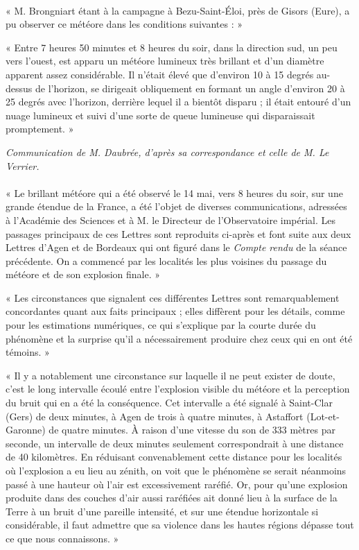 \documentclass[a4paper, 11pt, oneside, polutonikogreek, french]{article}
\begin{document}
\paragraph{}
« M. Brongniart étant à la campagne à Bezu-Saint-Éloi, près de Gisors (Eure), a pu observer ce météore dans les conditions suivantes : »

« Entre 7 heures 50 minutes et 8 heures du soir, dans la direction sud, un peu vers l'ouest, est apparu un météore lumineux très brillant et d'un diamètre apparent assez considérable. Il n'était élevé que d'environ 10 à 15 degrés au-dessus de l'horizon, se dirigeait obliquement en formant un angle d'environ 20 à 25 degrés avec l'horizon, derrière lequel il a bientôt disparu ; il était entouré d'un nuage lumineux et suivi d'une sorte de queue lumineuse qui disparaissait promptement. »
\begin{center}
\emph{Communication de M. Daubrée, d'après sa correspondance et celle de M. Le Verrier.}
\end{center}
\paragraph{}
« Le brillant météore qui a été observé le 14 mai, vers 8 heures du soir, sur une grande étendue de la France, a été l'objet de diverses communications, adressées à l'Académie des Sciences et à M. le Directeur de l'Observatoire impérial. Les passages principaux de ces Lettres sont reproduits ci-après et font suite aux deux Lettres d'Agen et de Bordeaux qui ont figuré dans le \emph{Compte rendu} de la séance précédente. On a commencé par les localités les plus voisines du passage du météore et de son explosion finale. »

« Les circonstances que signalent ces différentes Lettres sont remarquablement concordantes quant aux faits principaux ; elles diffèrent pour les détails, comme pour les estimations numériques, ce qui s'explique par la courte durée du phénomène et la surprise qu'il a nécessairement produire chez ceux qui en ont été témoins. »

« Il y a notablement une circonstance sur laquelle il ne peut exister de doute, c'est le long intervalle écoulé entre l'explosion visible du météore et la perception du bruit qui en a été la conséquence. Cet intervalle a été signalé à Saint-Clar (Gers) de deux minutes, à Agen de trois à quatre minutes, à Astaffort (Lot-et-Garonne) de quatre minutes. À raison d'une vitesse du son de 333 mètres par seconde, un intervalle de deux minutes seulement correspondrait à une distance de 40 kilomètres. En réduisant convenablement cette distance pour les localités où l'explosion a eu lieu au zénith, on voit que le phénomène se serait néanmoins passé à une hauteur où l'air est excessivement raréfié. Or, pour qu'une explosion produite dans des couches d'air aussi raréfiées ait donné lieu à la surface de la Terre à un bruit d'une pareille intensité, et sur une étendue horizontale si considérable, il faut admettre que sa violence dans les hautes régions dépasse tout ce que nous connaissons. »
\end{document}
